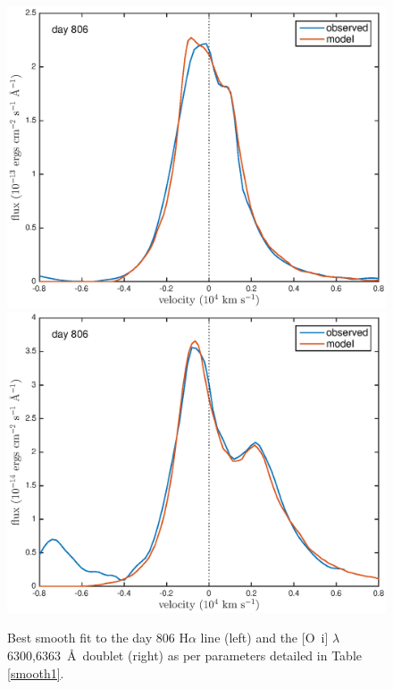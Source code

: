 \documentclass[useAMS,usenatbib,usegraphicx]{mnras}
\begin{document}
\begin{figure}
\begin{center}
\includegraphics[trim =37 10 45 15,clip=true,scale=0.51]{smooth/best_fit/d806Ha}
\includegraphics[trim =37 10 45 15,clip=true,scale=0.51]{smooth/best_fit/d806OI}
\caption{Best smooth fit to the day 806 H$\alpha$ line (left) and the 
[O~{\sc i}] $\lambda$6300,6363~\AA\ doublet (right) as per parameters 
detailed in Table \ref{smooth1}.}
\label{d806bf}
\end{center}
\end{figure}
\end{document}
